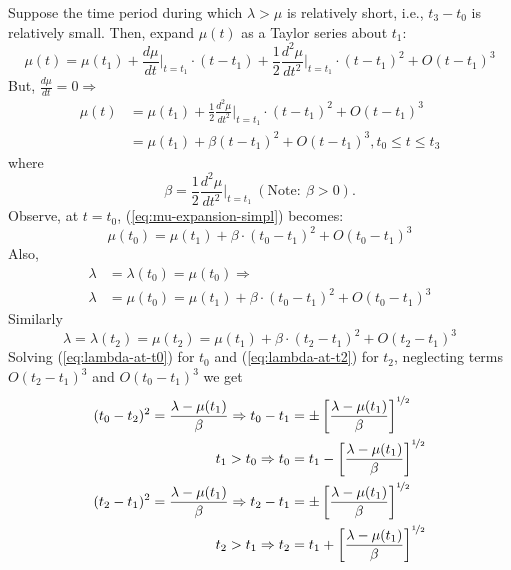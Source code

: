 \documentclass[12pt]{report}
\begin{document}
Suppose the time period during which $\lambda > \mu$ is relatively short, i.e., $t_3 - t_0$ is relatively
small. Then, expand $\mu(t)$ as a Taylor series about $t_1$:
\begin{equation}
  \label{eq:mu-expansion}
  \mu(t) = \mu(t_1)+\frac{d\mu}{dt}\Biggr\rvert_{t=t_1} \cdot{}(t-t_1)
  +\frac{1}{2}\frac{d^2\mu}{dt^2}\Biggr\rvert_{t=t_1} \cdot{}(t-t_1)^2
  +O(t-t_1)^3
\end{equation}
But, $\frac{d\mu}{dt} = 0 \Rightarrow$
\begin{equation}
\begin{split}
  \label{eq:mu-expansion-simpl}
  \mu(t) & = \mu(t_1)+\frac{1}{2}\frac{d^2\mu}{dt^2}\Biggr\rvert_{t=t_1}\cdot(t-t_1)^2+O(t-t_1)^3 \\
  ~& = \mu(t_1)+\beta (t-t_1)^2 + O(t-t_1)^3, t_0 \le t \le t_3
\end{split}
\end{equation}
where
\begin{equation}
  \label{eq:beta}
  \beta = \frac{1}{2}\frac{d^2\mu}{dt^2}\Biggr\rvert_{t=t_1} \: (\mathrm{Note:}\: \beta > 0).
\end{equation}
Observe, at $t=t_0$, (\ref{eq:mu-expansion-simpl}) becomes:
\begin{equation}
  \label{eq:mu-at-t0}
  \mu(t_0) = \mu(t_1) + \beta \cdot (t_0-t_1)^2+O(t_0-t_1)^3
\end{equation}
Also, 
\begin{equation}
  \label{eq:lambda-at-t0}
\begin{split}
  \lambda & = \lambda(t_0) = \mu(t_0) \Rightarrow \\
  \lambda & = \mu(t_0) = \mu(t_1) + \beta \cdot
  (t_0-t_1)^2+O(t_0-t_1)^3
\end{split}
\end{equation}
Similarly
\begin{equation}
  \label{eq:lambda-at-t2}
  \lambda = \lambda(t_2) = \mu(t_2) = \mu(t_1) + \beta \cdot (t_2-t_1)^2+O(t_2-t_1)^3
\end{equation}
Solving (\ref{eq:lambda-at-t0}) for $t_0$ and (\ref{eq:lambda-at-t2})
for $t_2$, neglecting terms $O(t_2 - t_1)^3$ and $O(t_0 - t_1 )^3$ we get
\begin{equation}
  \label{eq:t1-t2-implications}
  \begin{split}
    (t_0-t_2)^2 = \frac{\lambda-\mu(t_1)}{\beta} \Rightarrow t_0-t_1 & = \pm\left[\frac{\lambda-\mu(t_1)}{\beta}\right]^{\nicefrac{1}{2}}\\
    t_1>t_0 \Rightarrow t_0 & = t_1 - \left[\frac{\lambda-\mu(t_1)}{\beta}\right]^{\nicefrac{1}{2}}\\
    (t_2-t_1)^2 = \frac{\lambda-\mu(t_1)}{\beta} \Rightarrow t_2 - t_1 & = \pm\left[\frac{\lambda-\mu(t_1)}{\beta}\right]^{\nicefrac{1}{2}}\\
    t_2>t_1 \Rightarrow t_2 & = t_1  + \left[\frac{\lambda-\mu(t_1)}{\beta}\right]^{\nicefrac{1}{2}}
  \end{split}
\end{equation}
\end{document}
